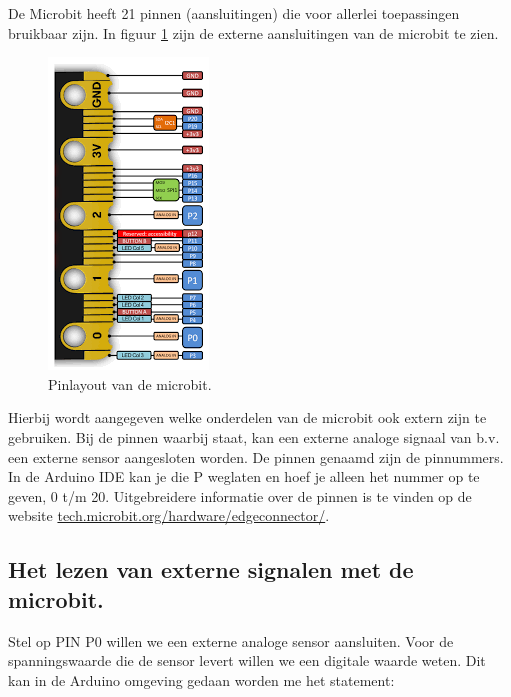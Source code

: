 De Microbit heeft 21 pinnen (aansluitingen) die voor allerlei toepassingen bruikbaar zijn. In figuur \ref{fig:ardPinB} zijn de externe aansluitingen van de microbit te zien. 
\begin{figure}[h!]
	\captionsetup{justification=centering}
	\includegraphics[width=0.4 \linewidth]{figuren/microbitCon}
	\centering
	\caption{Pinlayout van de microbit.}
	\label{fig:ardPinB}
\end{figure}
Hierbij wordt aangegeven welke onderdelen van de microbit ook extern zijn te gebruiken. Bij de pinnen waarbij  staat, kan een externe analoge signaal van b.v. een externe sensor aangesloten worden. De pinnen genaamd  zijn de pinnummers. In de Arduino IDE kan je die P weglaten en hoef je alleen het nummer op te geven, 0 t/m 20. Uitgebreidere informatie over de pinnen is te vinden op de website \href{https://tech.microbit.org/hardware/edgeconnector/}{tech.microbit.org/hardware/edgeconnector/}.\\

\subsection{Het lezen van externe signalen met de microbit.}

Stel op PIN P0 willen we een externe analoge sensor aansluiten. Voor de spanningswaarde die de sensor levert willen we een digitale waarde weten. 
Dit kan in de Arduino omgeving gedaan worden me het statement:\\

